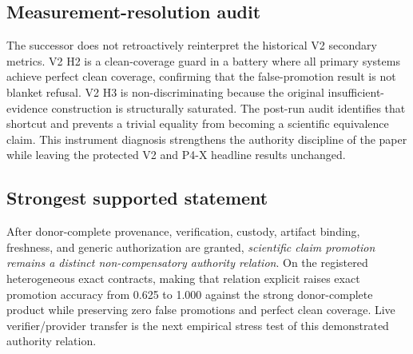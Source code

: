 \subsection{Measurement-resolution audit}

The successor does not retroactively reinterpret the historical V2 secondary metrics. V2 H2 is a clean-coverage guard in a battery where all primary systems achieve perfect clean coverage, confirming that the false-promotion result is not blanket refusal. V2 H3 is non-discriminating because the original insufficient-evidence construction is structurally saturated. The post-run audit identifies that shortcut and prevents a trivial equality from becoming a scientific equivalence claim. This instrument diagnosis strengthens the authority discipline of the paper while leaving the protected V2 and P4-X headline results unchanged.

\subsection{Strongest supported statement}

After donor-complete provenance, verification, custody, artifact binding, freshness, and generic authorization are granted, \emph{scientific claim promotion remains a distinct non-compensatory authority relation}. On the registered heterogeneous exact contracts, making that relation explicit raises exact promotion accuracy from 0.625 to 1.000 against the strong donor-complete product while preserving zero false promotions and perfect clean coverage. Live verifier/provider transfer is the next empirical stress test of this demonstrated authority relation.
